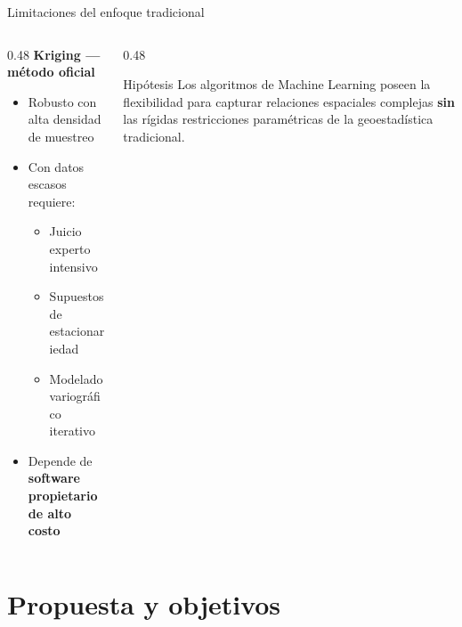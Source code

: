 \documentclass[10pt, aspectratio=169]{beamer}
\newcommand{\hl}[1]{\textcolor{accent}{\textbf{#1}}}
\begin{document}
	\begin{frame}{Limitaciones del enfoque tradicional}
		\begin{columns}[T]
			\begin{column}{0.48\textwidth}
				\textbf{Kriging — método oficial}
				\begin{itemize}
					\item Robusto con alta densidad de muestreo
					\item Con datos escasos requiere:
					\begin{itemize}
						\item Juicio experto intensivo
						\item Supuestos de estacionariedad
						\item Modelado variográfico iterativo
					\end{itemize}
					\item Depende de \hl{software propietario de alto costo}
				\end{itemize}
			\end{column}
			\begin{column}{0.48\textwidth}
				\begin{alertblock}{Hipótesis}
					Los algoritmos de Machine Learning poseen
					la flexibilidad para capturar relaciones
					espaciales complejas \textbf{sin} las rígidas
					restricciones paramétricas de la
					geoestadística tradicional.
				\end{alertblock}
			\end{column}
		\end{columns}
	\end{frame}
	
	\section{Propuesta y objetivos}
	
\end{document}
